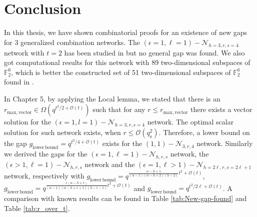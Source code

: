 \chapter{Conclusion} \label{chap:conclusion}

In this thesis, we have shown combinatorial proofs for an existence
of new gaps for 3 generalized combination networks. The $\left(\epsilon=1,\ell=1\right)-\mathcal{N}_{h=3,r,s=4}$
network with $t=2$ has been studied in \cite{Wachter-Zeh:2018,Etzion:2016,Zhang:2019,Etzion:2018}
but no general gap was found. We also got computational results for
this network with 89 two-dimensional subspaces of $\ensuremath{\mathbb{F}}_{2}^{6}$,
which is better the constructed set of 51 two-dimensional subspaces
of $\ensuremath{\mathbb{F}}_{2}^{6}$ found in \cite{Wachter-Zeh:2018}.

In Chapter 5, by applying the Local lemma, we stated that there is
an $r_{\mathrm{max,vector}}\in\Omega\left(q^{t^{2}/2+\mathcal{O}\left(t\right)}\right)$
such that for any $r\leq r_{\mathrm{max,vector}}$ there exists a
vector solution for the $\left(\epsilon=1,l=1\right)-\mathcal{N}_{h=3,r,s=4}$
network. The optimal scalar solution for such network exists, when
$r\leq\mathcal{O}\left(q_{\mathrm{s}}^{2}\right)$. Therefore, a lower
bound on the gap $g_{\mathrm{lower\,bound}}=q^{t^{2}/4+\mathcal{O}(t)}$
exists for the $\left(1,1\right)-\mathcal{N}_{3,r,4}$ network. Similarly
we derived the gaps for the $\left(\epsilon=1,\ell=1\right)-\mathcal{N}_{h,r,s}$
network, the $\left(\epsilon>1,\ell=1\right)-\mathcal{N}_{h,r,s}$
network and the $\left(\epsilon=1,\ell>1\right)-\mathcal{N}_{h=2\ell,r,s=2\ell+1}$
network, respectively with $g_{\mathrm{lower\,bound}}=q^{\frac{\alpha-h+1}{\left(\alpha-1\right)\left(\alpha-h+2\right)\left(h-2\right)}t^{2}+\mathcal{O}(t)}$,
$g_{\mathrm{lower\,bound}}=q^{\frac{\epsilon\left(\alpha-h+\epsilon\right)}{\left(\alpha-1\right)\left(\alpha-h+\epsilon+1\right)\left(h-\epsilon-1\right)}t^{2}+\mathcal{O}(t)}$
and $g_{\mathrm{lower\,bound}}=q^{t^{2}/2\ell+\mathcal{O}(t)}$. A
comparison with known results can be found in Table \ref{tab:New-gap-found}
and Table \ref{tab:r_over_t}.

